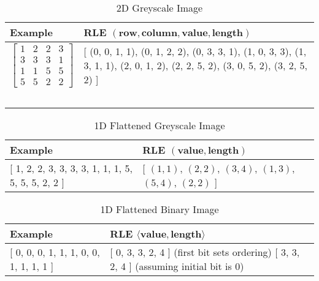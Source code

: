 \begin{table}[h]
    
    \begin{tabularx}{\textwidth}{ X | X }
        \toprule
        Example & RLE $(\textbf{row}, \textbf{column}, \textbf{value}, \textbf{length})$\\
        \midrule
        
        $$\begin{bmatrix}
        1 & 2 & 2 & 3  \\
        3 & 3 & 3 & 1  \\
        1 & 1 & 5 & 5  \\
        5 & 5 & 2 & 2
        \end{bmatrix}$$
        
        &
        {[} (0, 0, 1, 1), (0, 1, 2, 2), (0, 3, 3, 1), \newline
        (1, 0, 3, 3), (1, 3, 1, 1), (2, 0, 1, 2), \newline
        (2, 2, 5, 2), (3, 0, 5, 2), (3, 2, 5, 2) {]} \\
        \ & \ \\
    \bottomrule
    \end{tabularx}

    \label{table:rle-2d}
    \caption{2D Greyscale Image}
\end{table}


\begin{table}[h]
    \begin{tabularx}{\textwidth}{ X | X }
        \toprule
        Example & RLE $(\textbf{value}, \textbf{length})$\\
        \midrule
        
        {[} 1, 2, 2, 3, 3, 3, 3, 1, 1, 1, 5, 5, 5, 5, 2, 2 {]}
        &
        {[} $(1, 1)$,
        $(2, 2)$,
        $(3, 4)$,
        $(1, 3)$,
        $(5, 4)$,
        $(2, 2)$ {]} \\
    \bottomrule
    \end{tabularx}

    \label{table:rle-1d}
    \caption{1D Flattened Greyscale Image}
\end{table}

\begin{table}[h]
    \begin{tabularx}{\textwidth}{ X | X }
        \toprule
        Example & RLE $\langle \textbf{value}, \textbf{length} \rangle$\\
        \midrule
        
        {[} 0, 0, 0, 1, 1, 1, 0, 0, 1, 1, 1, 1 {]}
        &
        {[} 0, 3, 3, 2, 4 {]} (first bit sets ordering)\newline
        {[} 3, 3, 2, 4 {]} (assuming initial bit is 0) \\
    \bottomrule
    \end{tabularx}

    \label{table:rle-1d-binary}
    \caption{1D Flattened Binary Image}
\end{table}

